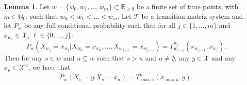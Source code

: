 \documentclass[10pt]{paper}
\theoremstyle{definition}
\newtheorem{lemma}[theorem]{Lemma}
\newcommand{\nats}{\mathbb{N}}
\newcommand{\reals}{\mathbb{R}}
\newcommand{\states}{\mathcal{X}}
\begin{document}
\begin{lemma}\label{lemma:simplechainextend}
Let $w=\{w_0,w_1,\dots,w_m\}\subset\reals_{\geq0}$ be a finite set of time points, with $m\in\nats_0$, such that $w_0<w_1<\dots<w_m$. Let $\mathcal{T}$ be a transition matrix system and let $\tilde{P}_w$ be any full conditional probability such that for all $j\in\{1,\dots,m\}$ and $x_{w_{\ell}}\in\states$, $\ell\in\{0,\dots,j\}$:
\begin{equation*}
\tilde{P}_w(X_{w_j}=x_{w_j}\vert X_{w_0}=x_{w_0},\dots,X_{w_{j-1}}=x_{w_{j-1}})=T_{w_{j-1}}^{w_j}(x_{w_{j-1}},x_{w_j}).
\end{equation*}
Then for any $s\in w$ and $u\subseteq w$ such that $s>u$ and $u\neq\emptyset$, any $y\in\states$ and any $x_u\in\states^u$, we have that
\begin{equation*}
\tilde{P}_w(X_s=y\vert X_u=x_u)
=T_{\max u}^s(x_{\max u},y).
\end{equation*}
\end{lemma}
\end{document}
